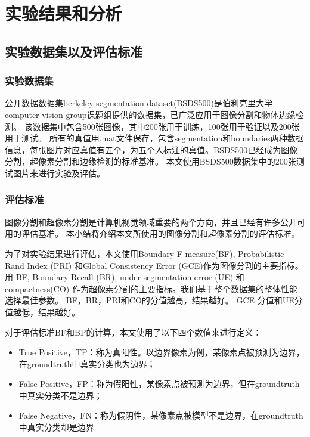 
\chapter{实验结果和分析}

\section{实验数据集以及评估标准}

\subsection{实验数据集}

公开数据数据集berkeley segmentation dataset(BSDS500)\cite{arbelaez2010contour}是伯利克里大学computer vision group课题组提供的数据集，已广泛应用于图像分割和物体边缘检测。
该数据集中包含500张图像，其中200张用于训练，100张用于验证以及200张用于测试。
所有的真值用.mat文件保存，包含segmentation和boundaries两种数据信息，每张图片对应真值有五个，为五个人标注的真值。BSDS500已经成为图像分割，超像素分割和边缘检测的标准基准。
本文使用BSDS500数据集中的200张测试图片来进行实验及评估。

\subsection{评估标准}

图像分割和超像素分割是计算机视觉领域重要的两个方向，并且已经有许多公开可用的评估基准。
本小结将介绍本文所使用的图像分割和超像素分割的评估标准。

为了对实验结果进行评估，本文使用Boundary F-measure(BF), Probabilistic Rand Index (PRI)\cite{carpineto2012consensus} 和Global Consistency Error (GCE)\cite{khelifi2016gce}作为图像分割的主要指标。用 BF, Boundary Recall (BR), under segmentation error (UE) 和compactness(CO) 作为超像素分割的主要指标。我们基于整个数据集的整体性能选择最佳参数。 BF，BR，PRI和CO的分值越高，结果越好。 GCE 分值和UE分值越低，结果越好。

对于评估标准BF和BP的计算，本文使用了以下四个数值来进行定义：

\begin{itemize}
\item True Positive，TP：称为真阳性。以边界像素为例，某像素点被预测为边界，在groundtruth中真实分类也为边界；
\item False Positive，FP：称为假阳性，某像素点被预测为边界，但在groundtruth中真实分类不是边界；
\item False Negative，FN：称为假阴性，某像素点被模型不是边界，在groundtruth中真实分类却是边界
\end{itemize}

